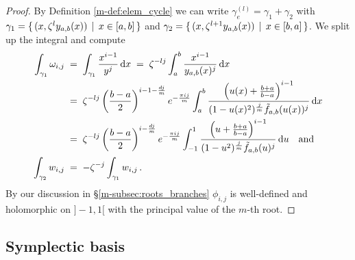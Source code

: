 \documentclass[main.tex]{subfiles}
\begin{document}
  \begin{proof}
    By Definition \ref{m-def:elem_cycle} we can write $\gamma_e^{(l)} = \gamma_1 + \gamma_2$ with $\gamma_1 = \{ \, (x,\zeta^l y_{a,b}(x)) \, \mid \, x \in [a,b] \, \}$ and
    $\gamma_2 = \{ \, (x,\zeta^{l+1}y_{a,b}(x)) \, \mid \, x \in [b,a] \, \}$. We split up the integral and compute
    \begin{align}\label{eq:thm_periods_2}
    \begin{split}
     \int_{\gamma_1} \omega_{i,j} \; & = \; \int_{\gamma_1} \frac{x^{i-1}}{y^j} \, \mathrm d x \; = \; \zeta^{-lj} \int_a^b \frac{x^{i-1}}{y_{a,b}(x)^j} \, \mathrm d x \\ \; & = \; 
     \zeta^{-lj} \left(\frac{b-a}{2}\right)^{i-1-\frac{dj}{m}} e^{-\frac{\pi i j}{m}} 
     \int_a^b \frac{\left(u(x)+\frac{b+a}{b-a}\right)^{i-1}}{(1-u(x)^2)^{\frac{j}{m}}\tilde{f}_{a,b}(u(x))^j} \, \mathrm d x \\
     \; & = \;   \zeta^{-lj} \left(\frac{b-a}{2}\right)^{i-\frac{dj}{m}} e^{-\frac{\pi i j}{m}}  
     \int_{-1}^1 \frac{\left(u+\frac{b+a}{b-a}\right)^{i-1}}{(1-u^2)^{\frac{j}{m}}\tilde{f}_{a,b}(u)^j} \, \mathrm d u \quad \text{and} \\
    \int_{\gamma_2} w_{i,j} \; & = \; - \zeta^{-j} \int_{\gamma_1} w_{i,j}\,.
    \end{split}
  \end{align}
  By our discussion in \S \ref{m-subsec:roots_branches} $\phi_{i,j}$ is well-defined and holomorphic on $]-1,1[$ with the principal value of the $m$-th root.
  \end{proof}
  

  \subsection{Symplectic basis}\label{subsec:symp_basis}
  
\end{document}
